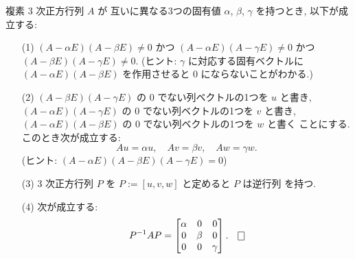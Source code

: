 \documentclass[12pt,twoside]{jarticle}
\begin{document}
\begin{question}[10点]
  \label{q:normal-form-3.1}
  複素 $3$ 次正方行列 $A$ が
  互いに異なる3つの固有値 $\alpha$, $\beta$, $\gamma$ を持つとき, 
  以下が成立する:
  \begin{enumerate}
  \item[(1)] 
    $(A - \alpha E)(A - \beta E) \ne 0$ 
    かつ $(A - \alpha E)(A - \gamma E) \ne 0$ 
    かつ $(A - \beta E)(A - \gamma E) \ne 0$.
    (ヒント: $\gamma$ に対応する固有ベクトルに $(A - \alpha E)(A - \beta E)$ 
    を作用させると $0$ にならないことがわかる.)
  \item[(2)] 
    $(A - \beta E)(A - \gamma E)$ の $0$ でない列ベクトルの1つを $u$ と書き,
    $(A - \alpha E)(A - \gamma E)$ の $0$ でない列ベクトルの1つを $v$ と書き,
    $(A - \alpha E)(A - \beta E)$ の $0$ でない列ベクトルの1つを $w$ と書く
    ことにする.  このとき次が成立する:
    \begin{equation*}
      Au = \alpha u,  \quad  Av = \beta v, \quad Aw = \gamma w.
    \end{equation*}
    (ヒント: $(A-\alpha E)(A-\beta E)(A-\gamma E)=0$)
  \item[(3)] $3$ 次正方行列 $P$ を $P := [u, v, w]$ と定めると $P$ は逆行列
    を持つ. 
  \item[(4)] 次が成立する:
    \begin{equation*}
      P^{-1} A P 
      = 
      \begin{bmatrix}
        \alpha & 0 & 0 \\
        0 & \beta & 0 \\
        0 & 0 & \gamma \\
      \end{bmatrix}.
      \qed
    \end{equation*}
  \end{enumerate}
\end{question}

\end{document}
